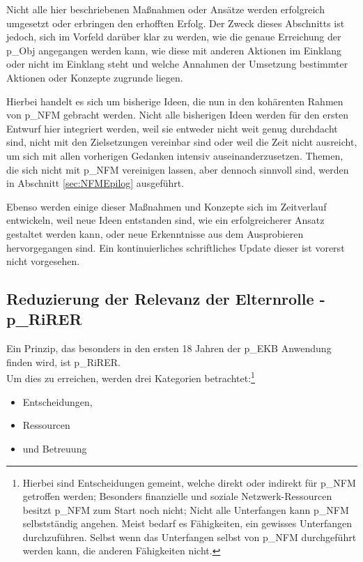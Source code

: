 Nicht alle hier beschriebenen Maßnahmen oder Ansätze werden erfolgreich umgesetzt oder erbringen den erhofften Erfolg. Der Zweck dieses Abschnitts ist jedoch, sich im Vorfeld darüber klar zu werden, wie die genaue Erreichung der \gls{p_Obj} angegangen werden kann, wie diese mit anderen Aktionen im Einklang oder nicht im Einklang steht und welche Annahmen der Umsetzung bestimmter Aktionen oder Konzepte zugrunde liegen.

Hierbei handelt es sich um bisherige Ideen, die nun in den kohärenten Rahmen von \gls{p_NFM} gebracht werden. Nicht alle bisherigen Ideen werden für den ersten Entwurf hier integriert werden, weil sie entweder nicht weit genug durchdacht sind, nicht mit den Zielsetzungen vereinbar sind oder weil die Zeit nicht ausreicht, um sich mit allen vorherigen Gedanken intensiv auseinanderzusetzen. Themen, die sich nicht mit \gls{p_NFM} vereinigen lassen, aber dennoch sinnvoll sind, werden in Abschnitt \ref{sec:NFMEpilog} ausgeführt.

Ebenso werden einige dieser Maßnahmen und Konzepte sich im Zeitverlauf entwickeln, weil neue Ideen entstanden sind, wie ein erfolgreicherer Ansatz gestaltet werden kann, oder neue Erkenntnisse aus dem Ausprobieren hervorgegangen sind. Ein kontinuierliches schriftliches Update dieser ist vorerst nicht vorgesehen.


\subsection{Reduzierung der Relevanz der Elternrolle - \gls{p_RiRER}}

Ein Prinzip, das besonders in den ersten 18 Jahren der \gls{p_EKB} Anwendung finden wird, ist \gls{p_RiRER}.\\

Um dies zu erreichen, werden drei Kategorien betrachtet:\footnote{
	Hierbei sind Entscheidungen gemeint, welche direkt oder indirekt für \gls{p_NFM} getroffen werden; Besonders finanzielle und soziale Netzwerk-Ressourcen besitzt \gls{p_NFM} zum Start noch nicht; Nicht alle Unterfangen kann \gls{p_NFM} selbstständig angehen. Meist bedarf es Fähigkeiten, ein gewisses Unterfangen durchzuführen. Selbst wenn das Unterfangen selbst von \gls{p_NFM} durchgeführt werden kann, die anderen Fähigkeiten nicht.
} 
\begin{itemize}
	\item Entscheidungen,
	\item Ressourcen
	\item und Betreuung
\end{itemize}

